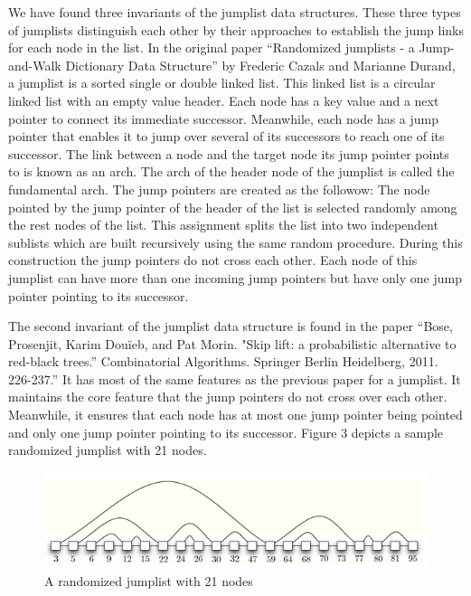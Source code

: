 \documentclass[oribibl]{llncs}
\begin{document}
We have found three invariants of the jumplist data structures. These three types of jumplists distinguish each other by their approaches to establish the jump links for each node in the list. In the original paper “Randomized jumplists - a Jump-and-Walk Dictionary Data Structure” by Frederic Cazals and Marianne Durand, a jumplist is a sorted single or double linked list. This linked list is a circular linked list with an empty value header. Each node has a key value and a next pointer to connect its immediate successor. Meanwhile, each node has a jump pointer that enables it to jump over several of its successors to reach one of its successor. The link between a node and the target node its jump pointer points to is known as an arch. The arch of the header node of the jumplist is called the fundamental arch. The jump pointers are created as the followow: The node pointed by the jump pointer of the header of the list is selected randomly among the rest nodes of the list. This assignment splits the list into two independent sublists which are built recursively using the same random procedure. During this construction the jump pointers do not cross each other. Each node of this jumplist can have more than one incoming jump pointers but have only one jump pointer pointing to its successor.

The second invariant of the jumplist data structure is found in the paper “Bose, Prosenjit, Karim Douïeb, and Pat Morin. "Skip lift: a probabilistic alternative to red-black trees.” Combinatorial Algorithms. Springer Berlin Heidelberg, 2011. 226-237.” It has most of the same features as the previous paper for a jumplist. It maintains the core feature that the jump pointers do not cross over each other. Meanwhile, it ensures that each node has at most one jump pointer being pointed and only one jump pointer pointing to its successor. Figure 3 depicts a sample randomized jumplist with 21 nodes.


\begin{figure}[here]
\center
\includegraphics[width=15cm]{images/jumplist}
\caption{A randomized jumplist with 21 nodes}
\label{fig:jumplist}
\end{figure}
\end{document}
